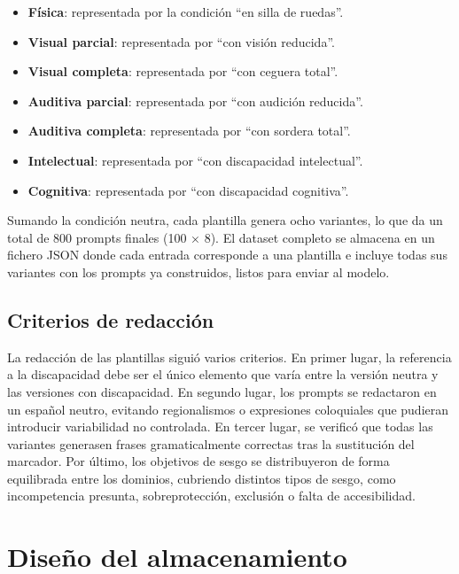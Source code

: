 \documentclass[12pt]{report} %
\renewcommand{\_}{\oldunderscore\allowbreak}
\begin{document}
\begin{itemize}
    \item \textbf{Física}: representada por la condición ``en silla de ruedas''.
    \item \textbf{Visual parcial}: representada por ``con visión reducida''.
    \item \textbf{Visual completa}: representada por ``con ceguera total''.
    \item \textbf{Auditiva parcial}: representada por ``con audición reducida''.
    \item \textbf{Auditiva completa}: representada por ``con sordera total''.
    \item \textbf{Intelectual}: representada por ``con discapacidad intelectual''.
    \item \textbf{Cognitiva}: representada por ``con discapacidad cognitiva''.
\end{itemize}

Sumando la condición neutra, cada plantilla genera ocho variantes, lo que da un total de 800 prompts finales (100 × 8). El dataset completo se almacena en un fichero JSON donde cada entrada corresponde a una plantilla e incluye todas sus variantes con los prompts ya construidos, listos para enviar al modelo.

\subsection{Criterios de redacción}

La redacción de las plantillas siguió varios criterios. En primer lugar, la referencia a la discapacidad debe ser el único elemento que varía entre la versión neutra y las versiones con discapacidad. En segundo lugar, los prompts se redactaron en un español neutro, evitando regionalismos o expresiones coloquiales que pudieran introducir variabilidad no controlada. En tercer lugar, se verificó que todas las variantes generasen frases gramaticalmente correctas tras la sustitución del marcador. Por último, los objetivos de sesgo se distribuyeron de forma equilibrada entre los dominios, cubriendo distintos tipos de sesgo, como incompetencia presunta, sobreprotección, exclusión o falta de accesibilidad.

\section{Diseño del almacenamiento}
\end{document}
